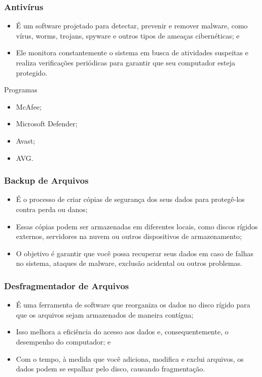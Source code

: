 \documentclass[aspectratio=169]{beamer} %
\begin{document}
\begin{frame}
	\frametitle{Antivírus}
	
	\begin{itemize}
		\item É um software projetado para detectar, prevenir e remover malware, como vírus, worms, trojans, spyware e outros tipos de ameaças cibernéticas; e
		\item Ele monitora constantemente o sistema em busca de atividades suspeitas e realiza verificações periódicas para garantir que seu computador esteja protegido.
	\end{itemize}\vfill

	\begin{exampleblock}{Programas}
		\begin{itemize}
			\item McAfee;
			\item Microsoft Defender;
			\item Avast;
			\item AVG.
		\end{itemize}
	\end{exampleblock}
\end{frame}

\begin{frame}
	\frametitle{Backup de Arquivos}
	
	\begin{itemize}
		\item É o processo de criar cópias de segurança dos seus dados para protegê-los contra perda ou danos;
		\item Essas cópias podem ser armazenadas em diferentes locais, como discos rígidos externos, servidores na nuvem ou outros dispositivos de armazenamento;
		\item O objetivo é garantir que você possa recuperar seus dados em caso de falhas no sistema, ataques de malware, exclusão acidental ou outros problemas.
	\end{itemize}
\end{frame}

\begin{frame}
	\frametitle{Desfragmentador de Arquivos}
	
	\begin{itemize}
		\item É uma ferramenta de software que reorganiza os dados no disco rígido para que os arquivos sejam armazenados de maneira contígua;
		\item Isso melhora a eficiência do acesso aos dados e, consequentemente, o desempenho do computador; e
		\item Com o tempo, à medida que você adiciona, modifica e exclui arquivos, os dados podem se espalhar pelo disco, causando fragmentação.
	\end{itemize}
\end{frame}
\end{document}
